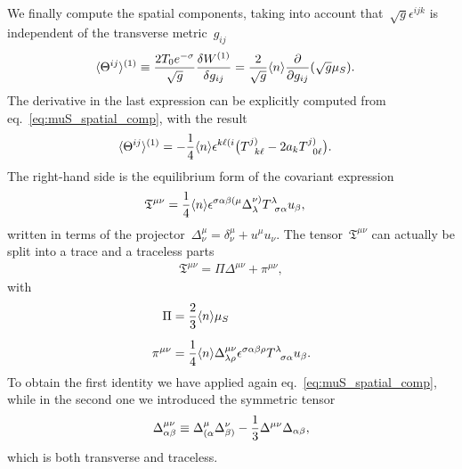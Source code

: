 \documentclass[11pt,a4paper]{article}
\begin{document}
We finally compute the spatial components, taking
into account
that~$\sqrt{g}\epsilon^{ijk}$ is
independent of the transverse metric~$g_{ij}$
\begin{align}
\langle\Theta^{ij}\rangle^{(1)}
&\equiv{2T_{0}e^{-\sigma}\over\sqrt{g}}{\delta W^{(1)}\over \delta g_{ij}}
={2\over \sqrt{g}}\langle n\rangle{\partial\over \partial g_{ij}}(\sqrt{g}\mu_{S}).
\label{eq:Thetaij}
\end{align}
The derivative in the last expression 
can be explicitly computed from eq.~\eqref{eq:muS_spatial_comp}, with the result
\begin{align}
\langle\Theta^{ij}\rangle^{(1)}&=
-{1\over 4}\langle n\rangle\epsilon^{k\ell (i}\big(T^{j)}_{\,\,\,\,k\ell}-2a_{k}T^{j)}_{\,\,\,\,0\ell}\big).
\label{eq:Thetaijgeneralf}
\end{align}
The right-hand side is the equilibrium form of the covariant expression
\begin{align}
\mathfrak{T}^{\mu\nu}&={1\over 4}\langle n\rangle 
\epsilon^{\sigma\alpha\beta(\mu}\Delta^{\nu)}_{\lambda}
T^{\lambda}_{\,\,\,\sigma\alpha}u_{\beta},
\end{align} 
written in terms of the projector~$\Delta^{\mu}_{\nu}=\delta^{\mu}_{\nu}+u^{\mu}u_{\nu}$.
The tensor~$\mathfrak{T}^{\mu\nu}$ can actually be split into a trace and a traceless parts 
\begin{align}
\mathfrak{T}^{\mu\nu}=\Pi\Delta^{\mu\nu}+\pi^{\mu\nu},
\end{align}
with
\begin{align}
\Pi&={2\over 3}\langle n\rangle\mu_{S} \nonumber \\[0.2cm]
\pi^{\mu\nu}&={1\over 4}\langle n\rangle \Delta^{\mu\nu}_{\lambda\rho}
\epsilon^{\sigma\alpha\beta\rho}
T^{\lambda}_{\,\,\,\,\sigma\alpha}u_{\beta}.
\label{eq:pimunu_ndiss}
\end{align}
To obtain the first identity we have applied again eq.~\eqref{eq:muS_spatial_comp}, while in the second one
we introduced the symmetric tensor
\begin{align}
\Delta^{\mu\nu}_{\alpha\beta}\equiv\Delta^{\mu}_{(\alpha}\Delta^{\nu}_{\beta)}-{1\over 3}\Delta^{\mu\nu}
\Delta_{\alpha\beta},
\end{align}
which is both transverse and traceless. 
\end{document}
